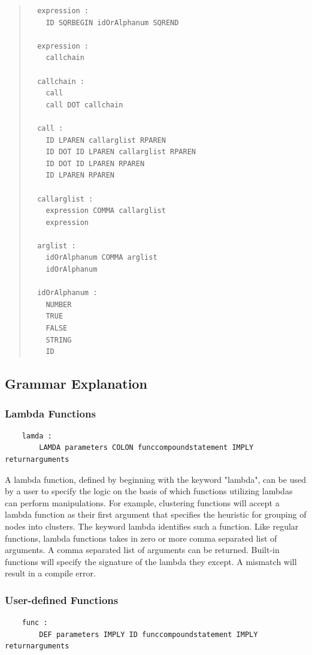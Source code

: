 \documentclass[a4paper]{article}
\begin{document}
\begin{quote}
\begin{lstlisting}
  expression :
  	ID SQRBEGIN idOrAlphanum SQREND
  
  expression :
  	callchain
  
  callchain :
  	call
  	call DOT callchain
  
  call :
    ID LPAREN callarglist RPAREN
    ID DOT ID LPAREN callarglist RPAREN
    ID DOT ID LPAREN RPAREN
    ID LPAREN RPAREN
  
  callarglist :
    expression COMMA callarglist
    expression
  
  arglist :
    idOrAlphanum COMMA arglist
    idOrAlphanum
  
  idOrAlphanum :  
    NUMBER
    TRUE
    FALSE
    STRING
    ID

\end{lstlisting}
\end{quote}

\subsection{Grammar Explanation}
\subsubsection{Lambda Functions}
\begin{verbatim}
    lamda :  
  		LAMDA parameters COLON funccompoundstatement IMPLY returnarguments
\end{verbatim}

\indent A lambda function, defined by beginning with the keyword "lambda", can be used by a user to specify the logic on the basis of which functions utilizing lambdas can perform manipulations. For example, clustering functions will accept a lambda function as their first argument that specifies the heuristic for grouping of nodes into clusters. The keyword lambda identifies such a function. Like regular functions, lambda functions takes in zero or more comma separated list of arguments. A comma separated list of arguments can be returned.
Built-in functions will specify the signature of the lambda they except. A mismatch will result in a compile error.

\subsubsection{User-defined Functions}
\begin{verbatim}
    func :  
  		DEF parameters IMPLY ID funccompoundstatement IMPLY returnarguments
\end{verbatim}
\end{document}
